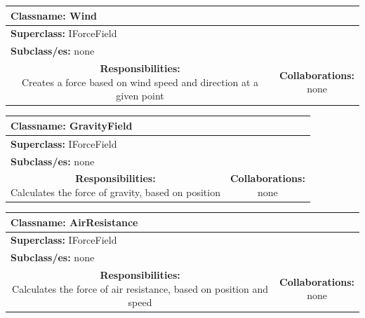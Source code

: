 \documentclass{article}
\begin{document}
\begin {center}
\begin{tabular}{|c|c|}
\hline
\multicolumn{2}{|l|}{\textbf{Classname:} Wind}\\
\hline
\multicolumn{2}{|l|}{\textbf{Superclass:} IForceField}\\
\multicolumn{2}{|l|}{\textbf{Subclass/es:} none}\\
\hline
\parbox[]{5cm}{\vspace{3px}\textbf{Responsibilities:} \\Creates a force based on wind speed and direction at a given point\vspace{3px}} & \parbox[]{5cm}{\textbf{Collaborations:}\\none}\\
\hline
 \end{tabular}\vspace{.4cm}

\begin{tabular}{|c|c|}
\hline
\multicolumn{2}{|l|}{\textbf{Classname:} GravityField}\\
\hline
\multicolumn{2}{|l|}{\textbf{Superclass:} IForceField}\\
\multicolumn{2}{|l|}{\textbf{Subclass/es:} none}\\
\hline
\parbox[]{5cm}{\vspace{3px}\textbf{Responsibilities:} \\Calculates the force of gravity, based on position\vspace{3px}} & \parbox[]{5cm}{\textbf{Collaborations:}\\none}\\
\hline
 \end{tabular}\vspace{.4cm}

\begin{tabular}{|c|c|}
\hline
\multicolumn{2}{|l|}{\textbf{Classname:} AirResistance}\\
\hline
\multicolumn{2}{|l|}{\textbf{Superclass:} IForceField}\\
\multicolumn{2}{|l|}{\textbf{Subclass/es:} none}\\
\hline
\parbox[]{5cm}{\vspace{3px}\textbf{Responsibilities:} \\Calculates the force of air resistance, based on position and speed\vspace{3px}} & \parbox[]{5cm}{\textbf{Collaborations:}\\none}\\
\hline
 \end{tabular}\vspace{.4cm}


\end{center}
\end{document}
